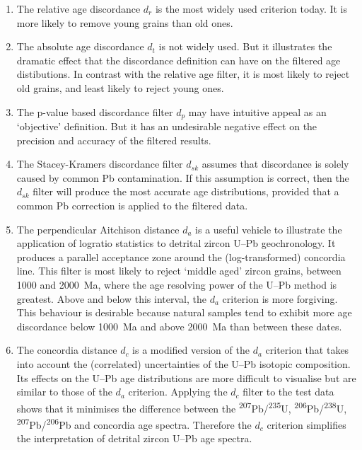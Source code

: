 \documentclass[gchron, manuscript]{copernicus}
\begin{document}
\begin{enumerate}
  \item The relative age discordance $d_r$ is the most widely used
    criterion today. It is more likely to remove young grains than old
    ones.
  \item The absolute age discordance $d_t$ is not widely used. But it
    illustrates the dramatic effect that the discordance definition
    can have on the filtered age distibutions. In contrast with the
    relative age filter, it is most likely to reject old grains, and
    least likely to reject young ones.
  \item The p-value based discordance filter $d_p$ may have intuitive
    appeal as an `objective' definition. But it has an undesirable
    negative effect on the precision and accuracy of the filtered
    results.
  \item The Stacey-Kramers discordance filter $d_{sk}$ assumes that
    discordance is solely caused by common Pb contamination. If this
    assumption is correct, then the $d_{sk}$ filter will produce the
    most accurate age distributions, provided that a
    \citet{stacey1975} common Pb correction is applied to the filtered
    data.
  \item The perpendicular Aitchison distance $d_a$ is a useful vehicle
    to illustrate the application of logratio statistics to detrital
    zircon U--Pb geochronology. It produces a parallel acceptance zone
    around the (log-transformed) concordia line. This filter is most
    likely to reject `middle aged' zircon grains, between 1000 and
    2000~Ma, where the age resolving power of the U--Pb method is
    greatest. Above and below this interval, the $d_a$ criterion is
    more forgiving. This behaviour is desirable because natural
    samples tend to exhibit more age discordance below 1000~Ma and
    above 2000~Ma than between these dates.
  \item The concordia distance $d_c$ is a modified version of the
    $d_a$ criterion that takes into account the (correlated)
    uncertainties of the U--Pb isotopic composition.  Its effects on
    the U--Pb age distributions are more difficult to visualise but
    are similar to those of the $d_a$ criterion.  Applying the $d_c$
    filter to the test data shows that it minimises the difference
    between the \textsuperscript{207}Pb/\textsuperscript{235}U,
    \textsuperscript{206}Pb/\textsuperscript{238}U,
    \textsuperscript{207}Pb/\textsuperscript{206}Pb and concordia age
    spectra. Therefore the $d_c$ criterion simplifies the
    interpretation of detrital zircon U--Pb age spectra.
\end{enumerate}
\end{document}

